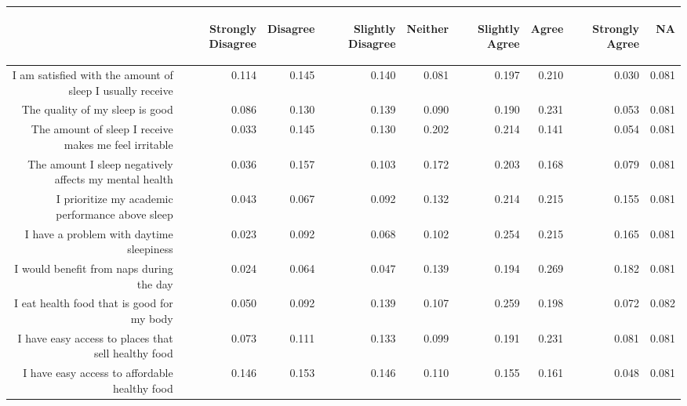 \documentclass{article}\usepackage[]{graphicx}\usepackage[]{color}
\begin{document}
\begin{table}[ht]
\centering
\begin{tabular}{rrrrrrrrr}
  \hline
 & \begin{sideways} Strongly Disagree \end{sideways} & \begin{sideways} Disagree \end{sideways} & \begin{sideways} Slightly Disagree \end{sideways} & \begin{sideways} Neither \end{sideways} & \begin{sideways} Slightly Agree \end{sideways} & \begin{sideways} Agree \end{sideways} & \begin{sideways} Strongly Agree \end{sideways} & \begin{sideways} NA \end{sideways} \\ 
  \hline
I am satisfied with the amount of sleep I usually receive & 0.114 & 0.145 & 0.140 & 0.081 & 0.197 & 0.210 & 0.030 & 0.081 \\ 
  The quality of my sleep is good & 0.086 & 0.130 & 0.139 & 0.090 & 0.190 & 0.231 & 0.053 & 0.081 \\ 
  The amount of sleep I receive makes me feel irritable & 0.033 & 0.145 & 0.130 & 0.202 & 0.214 & 0.141 & 0.054 & 0.081 \\ 
  The amount I sleep negatively affects my mental health & 0.036 & 0.157 & 0.103 & 0.172 & 0.203 & 0.168 & 0.079 & 0.081 \\ 
  I prioritize my academic performance above sleep & 0.043 & 0.067 & 0.092 & 0.132 & 0.214 & 0.215 & 0.155 & 0.081 \\ 
  I have a problem with daytime sleepiness & 0.023 & 0.092 & 0.068 & 0.102 & 0.254 & 0.215 & 0.165 & 0.081 \\ 
  I would benefit from naps during the day & 0.024 & 0.064 & 0.047 & 0.139 & 0.194 & 0.269 & 0.182 & 0.081 \\ 
  I eat health food that is good for my body & 0.050 & 0.092 & 0.139 & 0.107 & 0.259 & 0.198 & 0.072 & 0.082 \\ 
  I have easy access to places that sell healthy food & 0.073 & 0.111 & 0.133 & 0.099 & 0.191 & 0.231 & 0.081 & 0.081 \\ 
  I have easy access to affordable healthy food & 0.146 & 0.153 & 0.146 & 0.110 & 0.155 & 0.161 & 0.048 & 0.081 \\ 
   \hline
\end{tabular}
\end{table}
\end{document}
